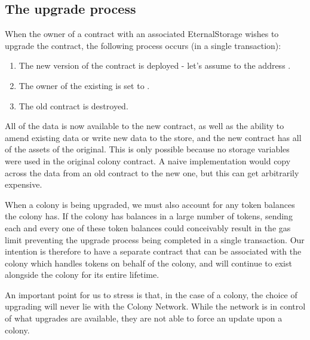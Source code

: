\subsection{The upgrade process}

When the owner of a contract with an associated EternalStorage wishes to upgrade the contract, the following process occurs (in a single transaction):

\begin{enumerate}
\item The new version of the contract is deployed - let's assume to the address .
\item The owner of the existing  is set to .
\item The old contract is destroyed.
\end{enumerate}

All of the data is now available to the new contract, as well as the ability to amend existing data or write new data to the store, and the new contract has all of the assets of the original. This is only possible because no storage variables were used in the original colony contract. A naive implementation would copy across the data from an old contract to the new one, but this can get arbitrarily expensive.

When a colony is being upgraded, we must also account for any token balances the colony has. If the colony has balances in a large number of tokens, sending each and every one of these token balances could conceivably result in the gas limit preventing the upgrade process being completed in a single transaction. Our intention is therefore to have a separate contract that can be associated with the colony which handles tokens on behalf of the colony, and will continue to exist alongside the colony for its entire lifetime.

An important point for us to stress is that, in the case of a colony, the choice of upgrading will never lie with the Colony Network. While the network is in control of what upgrades are available, they are not able to force an update upon a colony.